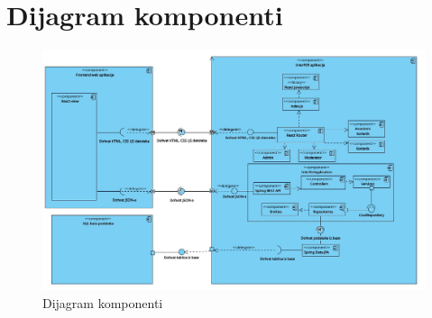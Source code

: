 \eject


\section{Dijagram komponenti}

\begin{figure}[H]
	\includegraphics[scale=0.4]{slike/dijagram_komponenti.jpeg}
	\centering
	\caption{Dijagram komponenti}
	\label{fig:component_diagram}
\end{figure}
